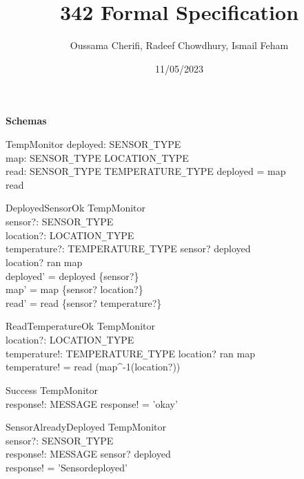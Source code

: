 \documentclass[12pt]{article}
\begin{document}
\title{342 Formal Specification}
\author{Oussama Cherifi, Radeef Chowdhury, Ismail Feham}
\date{11/05/2023}
\maketitle
\thispagestyle{empty}

\textbf{Schemas}

\begin{schema}{TempMonitor}
deployed: \power SENSOR\verb|_|TYPE \\
map: SENSOR\verb|_|TYPE \pfun LOCATION\verb|_|TYPE \\
read: SENSOR\verb|_|TYPE \pfun TEMPERATURE\verb|_|TYPE
\where
deployed = \dom map \\
\dom read
\end{schema}

\begin{schema}{DeployedSensorOk}
\Delta TempMonitor \\
sensor?: SENSOR\verb|_|TYPE \\
location?: LOCATION\verb|_|TYPE \\
temperature?: TEMPERATURE\verb|_|TYPE
\where
sensor? \notin deployed \\
location? \notin ran \hspace{0.15cm} map \\
deployed' = deployed \cup \{sensor?\} \\
map' = map \cup \{sensor? \rightarrow location?\} \\
read' = read \cup \{sensor? \rightarrow temperature?\}
\end{schema}

\begin{schema}{ReadTemperatureOk}
\Xi TempMonitor \\
location?: LOCATION\verb|_|TYPE \\
temperature!: TEMPERATURE\verb|_|TYPE
\where
location? \in ran \hspace{0.15cm} map \\
temperature! = read (map^{-1}(location?))
\end{schema}

\begin{schema}{Success}
\Xi TempMonitor \\
response!: MESSAGE
\where
response! = 'okay'
\end{schema}

\begin{schema}{SensorAlreadyDeployed}
\Xi TempMonitor \\
sensor?: SENSOR\verb|_|TYPE \\
response!: MESSAGE
\where
sensor? \in deployed \\
response! = 'Sensor\hspace{0.15cm}deployed'
\end{schema}
\end{document}
